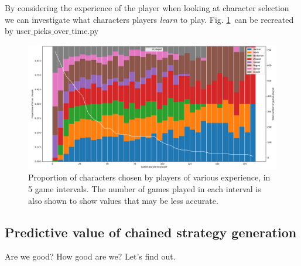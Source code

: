 \documentclass{tufte-handout}
\begin{document}
By considering the experience of the player when looking at character selection we can investigate what characters players \textit{learn} to play. Fig. \ref{fig:char-select-by-exp}~can be recreated by user$\_$picks$\_$over$\_$time.py

\begin{figure}
    \centering
    \includegraphics{character_selection_by_games_played.png}
    \caption{Proportion of characters chosen by players of various experience, in 5 game intervals. The number of games played in each interval is also shown to show values that may be less accurate.}
    \label{fig:char-select-by-exp}
\end{figure}

\subsection{Predictive value of chained strategy generation}

Are we good? How good are we? Let's find out.
\end{document}
